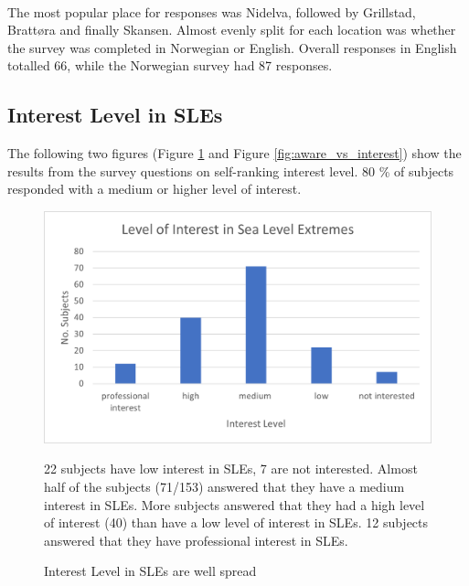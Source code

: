 \paragraph{}

The most popular place for responses was Nidelva, followed by Grillstad, Brattøra and finally Skansen. Almost evenly split for each location was whether the survey was completed in Norwegian or English. Overall responses in English totalled 66, while the Norwegian survey had 87 responses.  

\subsection{Interest Level in SLEs}
The following two figures (Figure \ref{fig:interest_level_SLE} and Figure \ref{fig:aware_vs_interest}) show the results from the survey questions on self-ranking interest level. 80 \% of subjects responded with a medium or higher level of interest. 


\begin{figure}[H]
    \centering
    \includegraphics{fig_results/interest-level.png}
    \caption{Interest Level in SLEs are well spread}{22 subjects have low interest in SLEs, 7 are not interested.  Almost half of the subjects (71/153) answered that they have a medium interest in SLEs. More subjects answered that they had a high level of interest (40) than have a low level of interest in SLEs. 12 subjects answered that they have professional interest in SLEs. }
    \label{fig:interest_level_SLE}
\end{figure}
\paragraph{}

